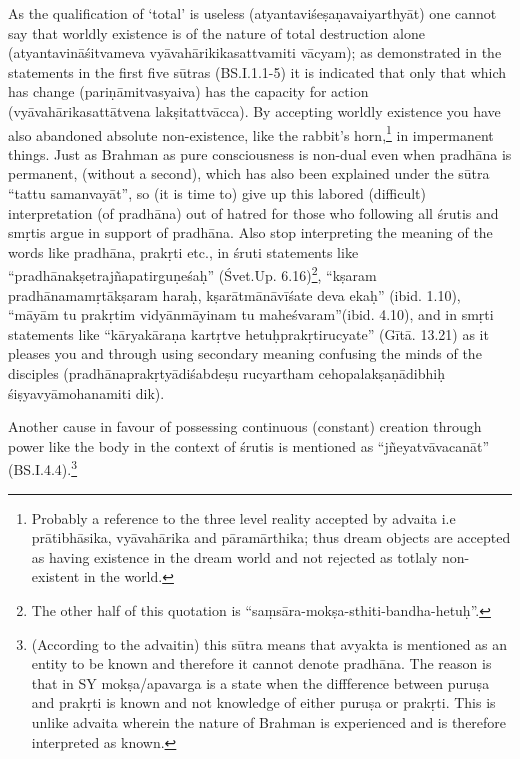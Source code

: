 \vskip 4pt


\vskip 4pt

As the qualification of ‘total’ is useless (atyantaviśeṣaṇavaiyarthyāt) one cannot say that worldly existence is of the nature of total destruction alone (atyantavināśitvameva vyāvahārikikasattvamiti vācyam); as demonstrated in the statements in the first five sūtras (BS.I.1.1-5) it is indicated that only that which has change (pariṇāmitvasyaiva) has the capacity for action (vyāvahārikasattātvena lakṣitattvācca). By accepting worldly existence you have also abandoned absolute non-existence, like the rabbit’s horn,\footnote{Probably a reference to the three level reality accepted by advaita i.e prātibhāsika, vyāvahārika and pāramārthika; thus dream objects are accepted as having existence in the dream world and not rejected as totlaly non-existent in the world.} in impermanent things.  Just as Brahman as pure consciousness is non-dual even when pradhāna is permanent, (without a second), which has also been explained under the sūtra “tattu samanvayāt”, so (it is time to) give up this labored (difficult) interpretation (of pradhāna) out of hatred for those who following all śrutis and smṛtis argue in support of pradhāna. Also stop interpreting the meaning of the words like pradhāna, prakṛti etc., in śruti statements like “pradhānakṣetrajñapatirguṇeśaḥ” (Śvet.Up. 6.16)\footnote{The other half of this quotation is “saṃsāra-mokṣa-sthiti-bandha-hetuḥ”.}, “kṣaram pradhānamamṛtākṣaram haraḥ, kṣarātmānāvīśate deva ekaḥ” (ibid. 1.10), “māyām tu prakṛtim vidyānmāyinam tu maheśvaram”(ibid. 4.10), and in smṛti statements like  “kāryakāraṇa kartṛtve hetuḥprakṛti\-rucyate” (Gītā. 13.21) as it pleases you and through using secondary meaning confusing the minds of the disciples (pradhānaprakṛtyādiśabdeṣu rucyartham cehopalakṣaṇādibhiḥ śiṣyavyāmohanamiti dik).

\newpage

Another cause in favour of possessing continuous (constant) creation through power like the body in the context of śrutis is mentioned as “jñeyatvāvacanāt” (BS.I.4.4).\footnote{(According to the advaitin) this sūtra means that avyakta is mentioned as an entity to be known and therefore it cannot denote pradhāna. The reason is that in SY mokṣa/apavarga is a state when the diffference between puruṣa and prakṛti is known and not knowledge of either puruṣa or prakṛti. This is unlike advaita wherein the nature of Brahman is experienced and is therefore interpreted as known.}

